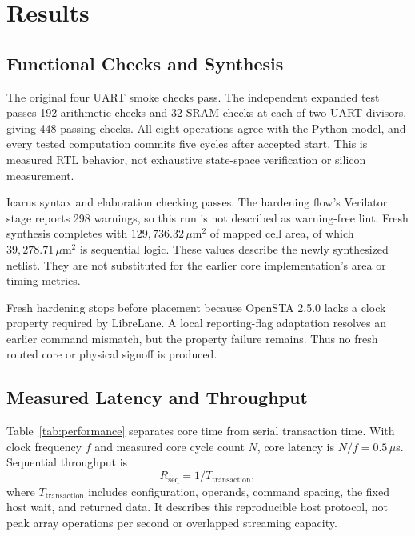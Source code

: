 \documentclass[conference,letterpaper]{IEEEtran}
\begin{document}
\section{Results}
\subsection{Functional Checks and Synthesis}
The original four UART smoke checks pass. The independent expanded test passes 192 arithmetic checks and 32 SRAM checks at each of two UART divisors, giving 448 passing checks. All eight operations agree with the Python model, and every tested computation commits five cycles after accepted start. This is measured RTL behavior, not exhaustive state-space verification or silicon measurement.

Icarus syntax and elaboration checking passes. The hardening flow's Verilator stage reports 298 warnings, so this run is not described as warning-free lint. Fresh synthesis completes with $129{,}736.32\,\mu$m$^2$ of mapped cell area, of which $39{,}278.71\,\mu$m$^2$ is sequential logic. These values describe the newly synthesized netlist. They are not substituted for the earlier core implementation's area or timing metrics.

Fresh hardening stops before placement because OpenSTA 2.5.0 lacks a clock property required by LibreLane. A local reporting-flag adaptation resolves an earlier command mismatch, but the property failure remains. Thus no fresh routed core or physical signoff is produced.

\subsection{Measured Latency and Throughput}
Table~\ref{tab:performance} separates core time from serial transaction time. With clock frequency $f$ and measured core cycle count $N$, core latency is $N/f=0.5\,\mu$s. Sequential throughput is
\begin{equation}
R_{\mathrm{seq}}=1/T_{\mathrm{transaction}},
\end{equation}
where $T_{\mathrm{transaction}}$ includes configuration, operands, command spacing, the fixed host wait, and returned data. It describes this reproducible host protocol, not peak array operations per second or overlapped streaming capacity.
\end{document}
